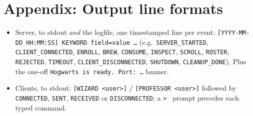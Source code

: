 \documentclass[11pt,a4paper]{article}
\begin{document}
\section*{Appendix: Output line formats}
\begin{itemize}[nosep]
  \item Server, to stdout \emph{and} the logfile, one timestamped line per
        event: \texttt{[YYYY-MM-DD HH:MM:SS] KEYWORD field=value \dots}
        (e.g.\ \texttt{SERVER\_STARTED}, \texttt{CLIENT\_CONNECTED},
        \texttt{ENROLL}, \texttt{BREW}, \texttt{CONSUME}, \texttt{INSPECT},
        \texttt{SCROLL}, \texttt{ROSTER}, \texttt{REJECTED}, \texttt{TIMEOUT},
        \texttt{CLIENT\_DISCONNECTED}, \texttt{SHUTDOWN}, \texttt{CLEANUP\_DONE}).
        Plus the one-off \texttt{Hogwarts is ready. Port: \dots} banner.
  \item Clients, to stdout: \texttt{[WIZARD <user>]} / \texttt{[PROFESSOR <user>]}
        followed by \texttt{CONNECTED}, \texttt{SENT}, \texttt{RECEIVED} or
        \texttt{DISCONNECTED}; a \texttt{> } prompt precedes each typed command.
\end{itemize}
\end{document}
